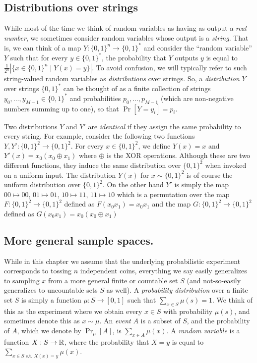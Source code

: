 \subsection{Distributions over
strings}\label{Distributions-over-strings}

While most of the time we think of random variables as having as output
a \emph{real number}, we sometimes consider random variables whose
output is a \emph{string}. That is, we can think of a map
\(Y:\{0,1\}^n \rightarrow \{0,1\}^*\) and consider the ``random
variable'' \(Y\) such that for every \(y\in \{0,1\}^*\), the probability
that \(Y\) outputs \(y\) is equal to
\(\tfrac{1}{2^n}\left| \{ x \in \{0,1\}^n \;|\; Y(x)=y \}\right|\). To
avoid confusion, we will typically refer to such string-valued random
variables as \emph{distributions} over strings. So, a
\emph{distribution} \(Y\) over strings \(\{0,1\}^*\) can be thought of
as a finite collection of strings \(y_0,\ldots,y_{M-1} \in \{0,1\}^*\)
and probabilities \(p_0,\ldots,p_{M-1}\) (which are non-negative numbers
summing up to one), so that \(\Pr[ Y = y_i ] = p_i\).

Two distributions \(Y\) and \(Y'\) are \emph{identical} if they assign
the same probability to every string. For example, consider the
following two functions \(Y,Y':\{0,1\}^2 \rightarrow \{0,1\}^2\). For
every \(x \in \{0,1\}^2\), we define \(Y(x)=x\) and
\(Y'(x)=x_0(x_0\oplus x_1)\) where \(\oplus\) is the XOR operations.
Although these are two different functions, they induce the same
distribution over \(\{0,1\}^2\) when invoked on a uniform input. The
distribution \(Y(x)\) for \(x\sim \{0,1\}^2\) is of course the uniform
distribution over \(\{0,1\}^2\). On the other hand \(Y'\) is simply the
map \(00 \mapsto 00\), \(01 \mapsto 01\), \(10 \mapsto 11\),
\(11 \mapsto 10\) which is a permutation over the map
\(F:\{0,1\}^2 \rightarrow \{0,1\}^2\) defined as \(F(x_0x_1)=x_0x_1\)
and the map \(G:\{0,1\}^2 \rightarrow \{0,1\}^2\) defined as
\(G(x_0x_1)=x_0(x_0 \oplus x_1)\)

\subsection{More general sample
spaces.}\label{More-general-sample-spaces}

While in this chapter we assume that the underlying probabilistic
experiment corresponds to tossing \(n\) independent coins, everything we
say easily generalizes to sampling \(x\) from a more general finite or
countable set \(S\) (and not-so-easily generalizes to uncountable sets
\(S\) as well). A \emph{probability distribution} over a finite set
\(S\) is simply a function \(\mu : S \rightarrow [0,1]\) such that
\(\sum_{x\in S}\mu(s)=1\). We think of this as the experiment where we
obtain every \(x\in S\) with probability \(\mu(s)\), and sometimes
denote this as \(x\sim \mu\). An \emph{event} \(A\) is a subset of
\(S\), and the probability of \(A\), which we denote by \(\Pr_\mu[A]\),
is \(\sum_{x\in A} \mu(x)\). A \emph{random variable} is a function
\(X:S \rightarrow {\mathbb{R}}\), where the probability that \(X=y\) is equal to
\(\sum_{x\in S \text{ s.t. } X(x)=y} \mu(x)\).

